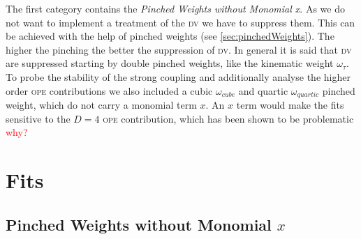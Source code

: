 \documentclass[../../index.tex]{subfiles}
\begin{document}
The first category contains the \textit{Pinched Weights without Monomial x}. As
we do not want to implement a treatment of the \textsc{dv} we have to suppress
them. This can be achieved with the help of pinched weights (see \cref{sec:pinchedWeights}).
The higher the pinching the better the suppression of \textsc{dv}. In general it
is said that \textsc{dv} are suppressed starting by double pinched weights, like the
kinematic weight \(\omega_\tau\). To probe the stability of the strong coupling
and additionally analyse the higher order \textsc{ope} contributions we also
included a cubic \(\omega_{cube}\) and quartic \(\omega_{quartic}\) pinched
weight, which do not carry a monomial term \(x\). An \(x\) term would make the
fits sensitive to the \(D=4\) \textsc{ope} contribution, which has been shown to
be problematic \cite{Beneke2012} \textcolor{red}{why?}






\section{Fits}

\subsection{Pinched Weights without Monomial \(x\)}
\end{document}
